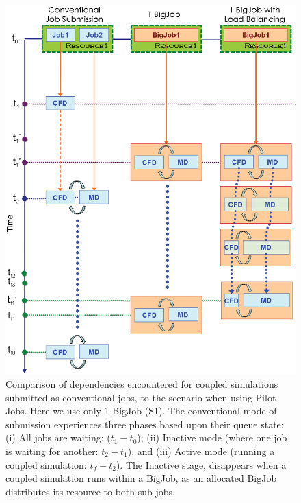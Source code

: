 \documentclass[conference,final]{IEEEtran}
\newcommand{\skonote}[1]{ {\textcolor{blue} { ***Jeff: #1 }}}
\newcommand{\skonote}[1]{}
\begin{document}
\begin{figure}
\centering
\includegraphics[scale=0.4]{Simulation_Time_of_One_BigJob.eps}
\caption{\small Comparison of dependencies encountered for coupled
  simulations submitted as conventional jobs, to the scenario when
  using Pilot-Jobs. Here we use only 1 BigJob (S1). The conventional
  mode of submission experiences three phases based upon their queue
  state: (i) All jobs are waiting: ($t_1-t_0$); (ii) Inactive mode
  (where one job is waiting for another: $t_2-t_1$), and (iii) Active
  mode (running a coupled simulation: $t_f-t_2$). The Inactive stage,
  disappears when a coupled simulation runs within a BigJob, as an
  allocated BigJob distributes its resource to both sub-jobs.}
\label{Fig:OneBJ_Flow}
\vspace{-1em}
\end{figure}


\end{document}
